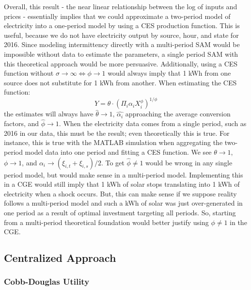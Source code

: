 \documentclass[12pt,a4paper]{extarticle}
\begin{document}
Overall, this result - the near linear relationship between the log of inputs and prices - essentially implies that we could approximate a two-period model of electricity into a one-period model by using a CES production function. This is useful, because we do not have electricity output by source, hour, and state for 2016. Since modeling intermittency directly with a multi-period SAM would be impossible without data to estimate the parameters, a single period SAM with this theoretical approach would be more persuasive. Additionally, using a CES function without $\sigma \to \infty \iff \phi \to 1$ would always imply that 1 kWh from one source does not substitute for 1 kWh from another. When estimating the CES function: 
$$Y = \theta \cdot \left( \Pi_i \alpha_i X_i^\phi \right)^{1/\phi}$$
the estimates will always have $\hat{\theta} \to 1$, $\hat{\alpha_i}$ approaching the average conversion factors, and $\hat{\phi} \to 1$. When the electricity data comes from a single period, such as 2016 in our data, this must be the result; even theoretically this is true. For instance, this is true with the MATLAB simulation when aggregating the two-period model data into one period and fitting a CES function. We see $\theta \to 1$, $\phi \to 1$, and $\alpha_i \to (\xi_{i,t} + \xi_{i,s})/2$.  To get $\hat{\phi} \neq 1$ would be wrong in any single period model, but would make sense in a multi-period model. Implementing this in a CGE would still imply that 1 kWh of solar stops translating into 1 kWh of electricity when a shock occurs. But, this can make sense if we suppose reality follows a multi-period model and such a kWh of solar was just over-generated in one period as a result of optimal investment targeting all periods. So, starting from a multi-period theoretical foundation would better justify using $\phi \neq 1$ in the CGE.

\pagebreak	

\subsection{Centralized Approach}

\subsubsection{Cobb-Douglas Utility}
\end{document}
